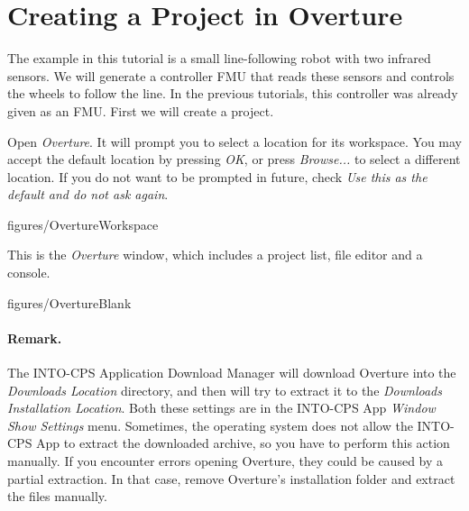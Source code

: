 \documentclass[11pt,a4paper]{../tutorial}
\begin{document}
\section{Creating a Project in Overture}

The example in this tutorial is a small line-following robot with two infrared sensors. We will generate a controller FMU that reads these sensors and controls the wheels to follow the line. 
In the previous tutorials, this controller was already given as an FMU.
First we will create a project.

\clearpage

\begin{instructions}
\item Open \emph{Overture}. It will prompt you to select a location for its workspace. You may accept the default location by pressing \emph{OK}, or press \emph{Browse...} to select a different location. If you do not want to be prompted in future, check \emph{Use this as the default and do not ask again}.

    \begin{annotation}[width=0.7\linewidth]{figures/OvertureWorkspace}
    \end{annotation}

    \newpage
    This is the \emph{Overture} window, which includes a project list, file editor and a console.

    \begin{annotation}[width=\linewidth]{figures/OvertureBlank}
    \end{annotation}

\paragraph{Remark.} The INTO-CPS Application Download Manager will download Overture into the \emph{Downloads Location} directory, and then will try to extract it to the \emph{Downloads Installation Location}. Both these settings are in the INTO-CPS App \emph{Window \menusep Show Settings} menu.
Sometimes, the operating system does not allow the INTO-CPS App to extract the downloaded archive, so you have to perform this action manually.
If you encounter errors opening Overture, they could be caused by a partial extraction.
In that case, remove Overture's installation folder and extract the files manually.


\end{instructions}
\end{document}
